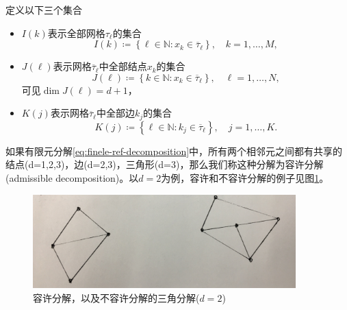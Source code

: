 定义以下三个集合
\begin{itemize}
  \item $I(k)$表示全部网格$\tau_{\ell}$的集合
  \begin{equation*}
    I(k) \coloneqq \left\{ \ell \in \mathbb{N}: x_{k} \in \overline{\tau}_{\ell} \right\}, \quad k = 1, \ldots, M,
  \end{equation*}
  \item $J(\ell)$表示网格$\overline{\tau}_{\ell}$中全部结点$x_{k}$的集合
  \begin{equation*}
    J(\ell) \coloneqq \left\{ k \in \mathbb{N}: x_{k} \in \overline{\tau}_{\ell} \right\}, \quad \ell = 1, \ldots, N,
  \end{equation*}
  可见$\dim J(\ell) = d+1$，
  \item $K(j)$表示网格$\overline{\tau}_{\ell}$中全部边$k_{j}$的集合
  \begin{equation*}
    K(j) \coloneqq \left\{ \ell \in \mathbb{N} : k_{j} \in \overline{\tau}_{\ell} \right\}, \quad j = 1, \ldots, K.
  \end{equation*}
\end{itemize}

如果有限元分解\eqref{eq:finele-ref-decomposition}中，所有两个相邻元之间都有共享的结点(d=1,2,3)，边(d=2,3)，三角形(d=3)，那么我们称这种分解为容许分解(admissible decomposition)。以$d=2$为例，容许和不容许分解的例子见图\ref{fig:finele-ref-decomp-admissible-example}。
\begin{figure}[htbp]
  \centering
  \includegraphics[width=4in]{./figures/20171209-decompo-adm-inadm.jpg}
 \caption{容许分解，以及不容许分解的三角分解($d=2$)}
\label{fig:finele-ref-decomp-admissible-example}

\end{figure}

